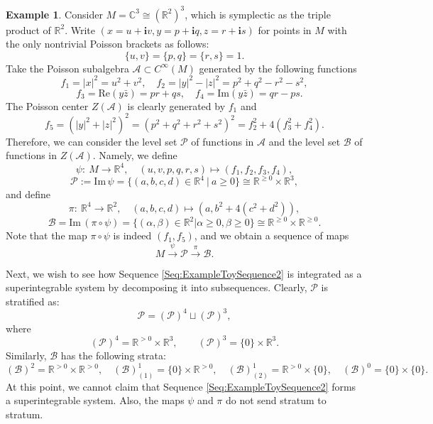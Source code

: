 \documentclass[12pt]{amsart}
\theoremstyle{definition}
\newtheorem{example}[theorem]{Example}
\numberwithin{equation}{section}
\def\Im{\mathrm{Im}\,}
\newcommand{\abs}[1]{\lvert#1\rvert}
\newcommand{\imagunit}{\mathbf{i}}
\newcommand{\Cinf}{C^\infty}
\newcommand{\SET}[1]{\{#1\}}
\begin{document}
  \begin{example}
    \label{Ex:R6}
Consider $M = \mathbb{C} ^3\cong (\mathbb{R}^2)^3   $, which is symplectic as the triple product  of $\mathbb{R}^2$. Write $(x=u+\imagunit v,y=p+\imagunit q,z=r+\imagunit s)$ for points in $M $ with the   only nontrivial Poisson brackets as follows:
$$
\SET{u,v}=\SET{p,q}=\SET{r,s}=1.
$$
 Take the Poisson subalgebra $\mathcal{A}\subset \Cinf(M )$  generated by the following functions $$ f_1=\abs{x}^2=u^2+v^2, \quad f_2=\abs{y}^2-\abs{z}^2=p^2+q^2-r^2-s^2,$$$$\quad  f_3=\mathrm{Re}(y\bar{z})=pr+qs, \quad  f_4=\mathrm{Im}(y\bar{z})=qr-ps.$$ The Poisson center  $Z(\mathcal{A})$ is clearly generated by $f_1$ and $$f_5=(\abs{y}^2+\abs{z}^2)^2= (p^2+q^2+r^2+s^2)^2=f_2^2+4(f_3^2+f_4^2).$$ 
 Therefore, we can consider the level set $\mathcal{P} $ of functions in $\mathcal{A}$
 and the level set $\mathcal{B} $ of functions in $Z(\mathcal{A})$. Namely, we define $$\psi:~M \to \mathbb{R}^4,\quad (u,v,p,q,r,s)\mapsto (f_1,f_2,f_3,f_4), $$
 $$\mathcal{P}  :=\Im \psi=\SET{(a,b,c,d)\in \mathbb{R}^4 ~|~ a\geqslant 0}\cong   \mathbb{R}^{\geqslant 0}\times \mathbb{R}^3,$$
 and define
 $$
 \pi:~\mathbb{R}^4\to \mathbb{R}^2,\quad (a,b,c,d)\mapsto (a,b^2+4(c^2+d^2)),
 $$
 $$\mathcal{B} =\Im (\pi\circ \psi)=\SET{(\alpha,\beta)\in \mathbb{R}^2| \alpha\geqslant 0,\beta\geqslant 0}\cong \mathbb{R}^{\geqslant 0}\times \mathbb{R}^{\geqslant 0}. $$
 Note that the map $\pi\circ \psi$ is indeed $(f_1,f_5)$, and we obtain a sequence of maps
 \begin{equation} \label{Seq:ExampleToySequence2} M   \overset{\psi}{\longrightarrow} \mathcal{P}  \overset{\pi}{\longrightarrow} \mathcal{B} .
  \end{equation}
    
  
  Next, we wish to see how Sequence \eqref{Seq:ExampleToySequence2} is integrated as a superintegrable system by decomposing    it into subsequences.   Clearly, $\mathcal{P}$ is stratified as:
 $$\mathcal{P} =(\mathcal{P})^4 \sqcup (\mathcal{P})^3 ,$$
 where
 $$(\mathcal{P})^4 =\mathbb{R}^{> 0}\times \mathbb{R}^3,\qquad (\mathcal{P})^3 =\SET{0}\times \mathbb{R}^3.$$
 Similarly, $\mathcal{B}$ has the following strata: 
 $$(\mathcal{B})^2 =\mathbb{R}^{> 0}\times \mathbb{R}^{> 0},\quad (\mathcal{B})^1_{(1)}  =\SET{0}\times \mathbb{R}^{> 0},\quad (\mathcal{B})^1_{(2)}  = \mathbb{R}^{> 0}\times \SET{0},\quad  (\mathcal{B})^0  =\SET{0}\times \SET{0}.
 $$
At this point, we cannot claim that Sequence \eqref{Seq:ExampleToySequence2} forms a superintegrable system. Also,    the maps $\psi$ and  $\pi$ do not  send stratum to stratum. 


\end{example}
\end{document}
